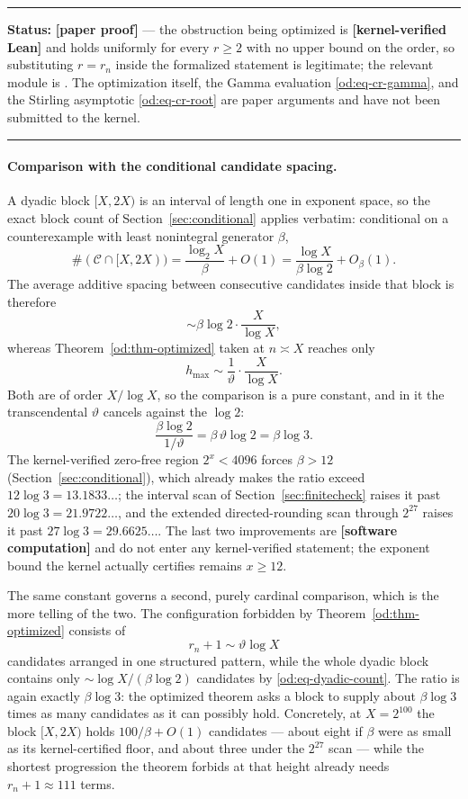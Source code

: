 \documentclass[11pt,oneside]{article}
\theoremstyle{definition}
\theoremstyle{remark}
\newcommand{\thetaq}{\vartheta}
\newcommand{\Cand}{\mathcal C}
\newcommand{\lean}[1]{\texttt{\detokenize{#1}}}
\newcommand{\statuslean}{\textcolor{leanblue}{\textbf{[kernel-verified Lean]}}}
\newcommand{\statusnew}{\textcolor{newgreen}{\textbf{[paper proof]}}}
\newcommand{\statuscomp}{\textcolor{computeviolet}{\textbf{[software computation]}}}
\newenvironment{statusbox}[1]
{\begin{center}\begin{minipage}{0.94\textwidth}\raggedright\hbadness=10000\hrule
\vspace{0.45em}\textbf{Status:} #1\par\vspace{0.35em}}
{\vspace{0.35em}\hrule\end{minipage}\end{center}}
\begin{document}
\begin{statusbox}{\statusnew{} --- the obstruction being optimized is \statuslean{} and holds
uniformly for every $r\ge2$ with no upper bound on the order, so substituting $r=r_n$ inside
the formalized statement is legitimate; the relevant module is \lean{HigherDifference}.  The
optimization itself, the Gamma evaluation \eqref{od:eq-cr-gamma}, and the Stirling asymptotic
\eqref{od:eq-cr-root} are paper arguments and have not been submitted to the kernel.}
\end{statusbox}

\paragraph{Comparison with the conditional candidate spacing.}
A dyadic block $[X,2X)$ is an interval of length one in exponent space, so the exact block
count of Section~\ref{sec:conditional} applies verbatim: conditional on a counterexample with
least nonintegral generator $\beta$,
\begin{equation}
 \#(\Cand\cap[X,2X))
 =\frac{\log_2X}{\beta}+O(1)
 =\frac{\log X}{\beta\log2}+O_\beta(1).
 \label{od:eq-dyadic-count}
\end{equation}
The average additive spacing between consecutive candidates inside that block is therefore
\[
 \sim\beta\log2\cdot\frac{X}{\log X},
\]
whereas Theorem~\ref{od:thm-optimized} taken at $n\asymp X$ reaches only
\[
 h_{\max}\sim\frac1\thetaq\cdot\frac{X}{\log X}.
\]
Both are of order $X/\log X$, so the comparison is a pure constant, and in it the
transcendental $\thetaq$ cancels against the $\log2$:
\begin{equation}
 \frac{\beta\log2}{1/\thetaq}
 =\beta\,\thetaq\log2
 =\beta\log3 .
 \label{od:eq-spacing-ratio}
\end{equation}
The kernel-verified zero-free region $2^x<4096$ forces $\beta>12$ (Section~\ref{sec:conditional}),
which already makes the ratio exceed $12\log3=13.1833\ldots$; the interval scan of
Section~\ref{sec:finitecheck} raises it past $20\log3=21.9722\ldots$, and the extended
directed-rounding scan through $2^{27}$ raises it past $27\log3=29.6625\ldots$.  The last two
improvements are \statuscomp{} and do not enter any kernel-verified statement; the exponent
bound the kernel actually certifies remains $x\ge12$.

The same constant governs a second, purely cardinal comparison, which is the more telling of
the two.  The configuration forbidden by Theorem~\ref{od:thm-optimized} consists of
\[
 r_n+1\sim\thetaq\log X
\]
candidates arranged in one structured pattern, while the whole dyadic block contains only
$\sim\log X/(\beta\log2)$ candidates by \eqref{od:eq-dyadic-count}.  The ratio is again
exactly $\beta\log3$: the optimized theorem asks a block to supply about $\beta\log3$ times
as many candidates as it can possibly hold.  Concretely, at $X=2^{100}$ the block $[X,2X)$
holds $100/\beta+O(1)$ candidates --- about eight if $\beta$ were as small as its
kernel-certified floor, and about three under the $2^{27}$ scan --- while the shortest
progression the theorem forbids at that height already needs $r_n+1\approx111$ terms.
\end{document}
